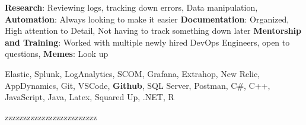 \documentclass[a4paper]{mctemplate} %
\begin{document}
\begin{sidebar}

\makepicture{2.1cm}


\begin{contacttable}
\end{contacttable}


\begin{skilltable}
	\skillitem
	{\textbf{Research}: Reviewing logs, tracking down errors, Data manipulation, }
	\skillitem
	{\textbf{Automation}: Always looking to make it easier}
	\skillitem
	{\textbf{Documentation}: Organized, High attention to Detail, Not having to track something down later}
	\skillitem
	{\textbf{Mentorship and Training}: Worked with multiple newly hired DevOps Engineers, open to questions, }
	\skillitem
	{\textbf{Memes}: Look up}
\end{skilltable}




\begin{codingtable}
	{Elastic, Splunk, LogAnalytics, SCOM, Grafana, Extrahop, New Relic, AppDynamics, Git, VSCode, \textbf{Github}, SQL Server, Postman, C\#, C++, JavaScript, Java, Latex, Squared Up, .NET, R}
\end{codingtable}

\begin{goodstuff}
	{zzzzzzzzzzzzzzzzzzzzzzzzz}
\end{goodstuff}

\end{sidebar}
\end{document}
